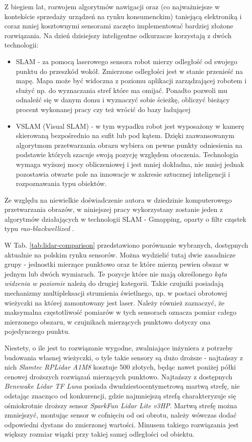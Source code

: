 Z biegiem lat, rozwojem algorytmów nawigacji oraz (co najważniejsze w kontekście sprzedaży urządzeń na rynku konsumenckim) taniejącą elektroniką i coraz mniej kosztownymi sensorami zaczęto implementować bardziej złożone rozwiązania. Na dzień dzisiejszy inteligentne odkurzacze korzystają z dwóch technologii:
\begin{itemize}
\item SLAM - za pomocą laserowego sensora robot mierzy odległość od swojego punktu do przeszkód wokół. Zmierzone odległości jest w stanie przenieść na mapę. Mapa może być widoczna z poziomu aplikacji zarządzającej robotem i służyć np. do wyznaczania stref które ma omijać. Ponadto pozwoli mu odnaleźć się w danym domu i wyznaczyć sobie ścieżkę, obliczyć bieżący procent wykonanej pracy czy też wrócić do bazy ładującej
\item VSLAM (Visual SLAM) - w tym wypadku robot jest wyposażony w kamerę skierowaną bezpośrednio na sufit lub pod kątem. Dzięki zaawansowanym algorytmom przetwarzania obrazu wybiera on pewne punkty odniesienia na podstawie których szacuje swoją pozycję względem otoczenia. Technologia wymaga wyższej mocy obliczeniowej i jest mniej dokładna, nie mniej jednak pozostawia otwarte pole na innowacje w zakresie sztucznej inteligencji i rozpoznawania typu obiektów.
\end{itemize}

Ze względu na niewielkie doświadczenie autora w dziedzinie komputerowego przetwarzania obrazów, w niniejszej pracy wykorzystany zostanie jeden z algorytmów działających w technologii SLAM - Gmapping, oparty o filtr cząstek typu \emph{rao-blackwellized} \cite{Murphy2000}\cite{Grisetti2005}\cite{Grisetti2007}.

W Tab. \ref{tab:lidar-comparison} przedstawiono porównanie wybranych, dostępnych aktualnie na polskim rynku sensorów. Można wydzielić tutaj dwie zasadnicze grupy - jednostki mierzące punktowo oraz te które mierzą pewien obszar w jednym lub dwóch wymiarach. Te pozycje które nie mają określonego \emph{kąta widzenia w poziomie} należą do drugiej kategorii. Takie czujniki posiadają mechanizmy multipleksacji strumienia świetlnego, np. w postaci obrotowej wieżyczki na której zamontowany jest laser. Należy również zaznaczyć, że maksymalna częstotliwość pomiarów w tych sensorach oznacza pomiar całego mierzonego obszaru, w czujnikach mierzących punktowo dotyczy ona pojedynczego punktu.

Niestety, o ile jest to rozwiązanie wygodne, zwalniające inżyniera z potrzeby budowania własnej wieżyczki, o tyle takie sensory są dużo droższe - najtańszy z nich \emph{Slamtec RPLidar A1M8} kosztuje 500 złotych, będąc nawet poniżej półki cenowej droższych rozwiązań mierzących punktowo. Najtańszy z dostępnych \emph{Benewake Lidar TF Luna} posiada dwudziestocentymetrową martwą strefę, nie odstając znacząco od konkurencji, gdzie najmniejszą strefą charakteryzuje się ośmiokrotnie droższy sensor \emph{SparkFun Lidar Lite v3HP}. Martwą strefę można zmniejszyć, montując sensor w cofnięciu od osi obrotu, należy wówczas dodać odpowiedni dystans do zmierzonej wartości. Minusem takiego rozwiązania jest większy rozmiar wiązki przy takiej samej odległości od obiektu. 


